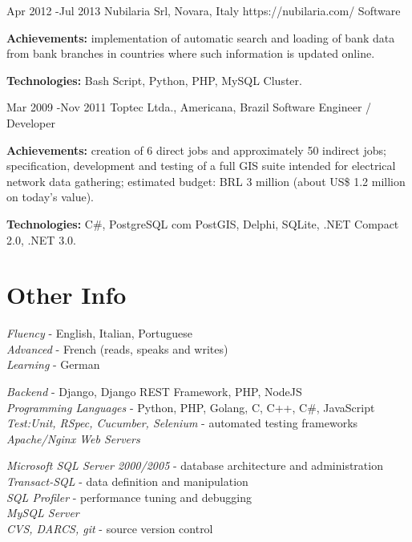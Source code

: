 \documentclass[10pt]{article} %
\begin{document}
\job
{Apr 2012 -}{Jul 2013}
{Nubilaria Srl, Novara, Italy}
{https://nubilaria.com/}
{Software }
{\rule{0mm}{2mm}\textbf{Achievements:} implementation of automatic search and loading of bank data from bank branches in countries where such information is updated online.\\
\rule{0mm}{3mm}\textbf{Technologies:} Bash Script, Python, PHP, MySQL Cluster.}

\job
{Mar 2009 -}{Nov 2011}
{Toptec Ltda., Americana, Brazil}
{}
{Software Engineer / Developer}
{\rule{0mm}{2mm}\textbf{Achievements:} creation of 6 direct jobs and approximately 50 indirect jobs; specification, development and testing of a full GIS suite intended for electrical network data gathering; estimated budget: BRL 3 million (about US\$ 1.2 million on today’s value). \\
\rule{0mm}{3mm}\textbf{Technologies:} C\#, PostgreSQL com PostGIS, Delphi, SQLite, .NET Compact 2.0, .NET 3.0.}



\section{Other Info}

{
\textit{Fluency} - English, Italian, Portuguese\\
\textit{Advanced} - French (reads, speaks and writes)\\
\textit{Learning} - German\\
}


{
\textit{Backend} - Django, Django REST Framework, PHP, NodeJS\\
\textit{Programming Languages} - Python, PHP, Golang, C, C++, C#, JavaScript\\
\textit{Test:Unit, RSpec, Cucumber, Selenium} - automated testing frameworks\\
\textit{Apache/Nginx Web Servers}\\
}


{
\textit{Microsoft SQL Server 2000/2005} - database architecture and administration\\
\textit{Transact-SQL} - data definition and manipulation\\
\textit{SQL Profiler} - performance tuning and debugging\\
\textit{MySQL Server}\\
\textit{CVS, DARCS, git} - source version control
}
\end{document}

